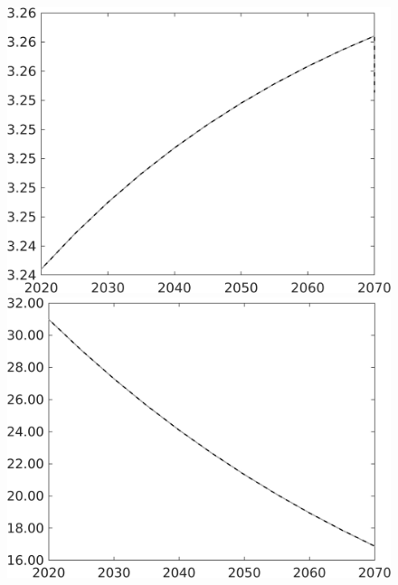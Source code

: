 \documentclass[12pt]{article}
\begin{document}
\begin{figure}[h!!]
\begin{minipage}[]{0.32\textwidth}
	\end{minipage}	
		\begin{minipage}[]{0.32\textwidth}
			\includegraphics[width=1\textwidth]{../../codding_model/own_basedOnFried/optimalPol_010922_revision/figures/all_13Sept22/CompTaul_LFBAU_Reg0_gAn_spillover0_nsk1_xgr0_knspil1_sep1_countec0_GovRev0_etaa0.79_lgd0.png}
		\end{minipage}	
		\begin{minipage}[]{0.32\textwidth}
			\includegraphics[width=1\textwidth]{../../codding_model/own_basedOnFried/optimalPol_010922_revision/figures/all_13Sept22/CompTaul_LFBAU_Reg0_gAg_spillover0_nsk1_xgr0_knspil1_sep1_countec0_GovRev0_etaa0.79_lgd0.png}

\end{minipage}
\end{figure}
\end{document}
